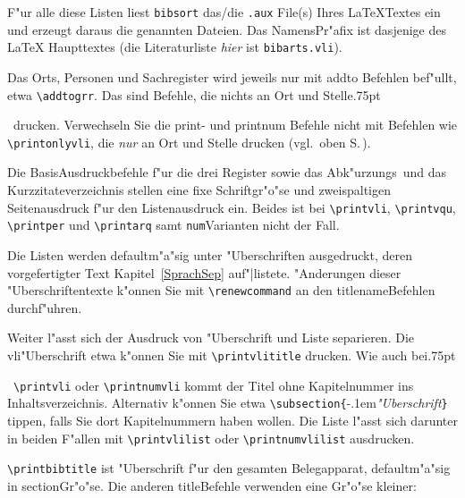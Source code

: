 \documentclass[12pt,a4paper]{article}
\newcommand{\pdfko}[1]{\kern #1pt
                          \strut\ignorespaces}%
\begin{document}
F"ur alle diese Listen liest \verb|bibsort| das\slash die \verb|.aux|\hy 
File{\small(}s{\small)} Ihres \LaTeX\hy Textes ein und erzeugt daraus 
die genannten Dateien. Das Namens\hy Pr"afix ist dasjenige des \LaTeX\hy 
Haupttextes (die Literaturliste \textit{hier} ist \verb|bibarts.vli|). 

Das Orts\fhy, Personen und Sachregister wird jeweils nur mit addto\hy 
Befehlen bef"ullt, etwa \verb|\addtogrr|. Das sind Befehle, die nichts 
an Ort und Stelle\pdfko{.75}\ 
drucken. Verwechseln Sie die print- und printnum\hy 
Befehle nicht mit Befehlen wie \verb|\printonlyvli|, die \textit{nur} 
an Ort und Stelle drucken (vgl.\ oben S.\,\pageref{printonly}). 

Die Basis\hy Ausdruckbefehle f"ur die drei Register
sowie das Abk"urzungs\hy\ und das Kurzzitateverzeichnis 
stellen eine fixe Schriftgr"o"se und zweispaltigen 
Seitenausdruck f"ur den Listenausdruck ein. Beides ist bei 
\verb|\printvli|, \verb|\printvqu|, \verb|\printper| und 
\verb|\printarq| samt \verb|num|\hy Varianten nicht der Fall.

Die Listen werden defaultm"a"sig unter "Uberschriften ausgedruckt, 
deren vorgefertigter Text Kapitel~\ref{SprachSep}
auf"|listete. "Anderungen dieser "Uberschriftentexte k"onnen Sie mit 
\verb|\renewcommand| an den titlename\hy Befehlen durchf"uhren. 

Weiter l"asst sich der Ausdruck von "Uberschrift und Liste 
separieren. Die vli\hy "Uberschrift etwa k"onnen Sie mit 
\verb|\printvlititle| drucken. Wie auch bei\pdfko{.75}\ 
\verb|\printvli| oder \verb|\printnumvli| kommt der 
Titel ohne Kapitelnummer ins Inhaltsverzeichnis. Alternativ 
k"onnen Sie etwa \verb|\subsection{|\kern -.1em\textit{"Uberschrift}\verb|}| 
tippen, falls Sie dort Kapitelnummern haben wollen.
Die Liste l"asst sich darunter in beiden F"allen mit \verb|\printvlilist| 
oder \verb|\printnumvlilist| ausdrucken. 


\noindent
\verb|\printbibtitle| ist "Uberschrift f"ur den gesamten Belegapparat, 
defaultm"a"sig in section\hy Gr"o"se. Die anderen title\hy Befehle 
verwenden eine Gr"o"se kleiner:
\end{document}
